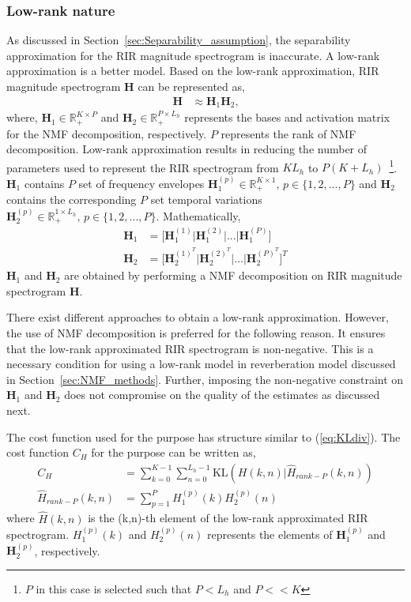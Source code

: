 \subsubsection{Low-rank nature}
As discussed in Section~\ref{sec:Separability_assumption}, the separability approximation for the RIR magnitude spectrogram is inaccurate. A low-rank approximation is a better model. Based on the low-rank approximation, RIR magnitude spectrogram $\mathbf{H}$ can be represented as,
\begin{align}
\mathbf{H} &\approx \mathbf{H}_1\mathbf{H}_2 \text{,}
\end{align}
where, $\mathbf{H}_1 \in \mathbb{R}_+^{K \times P}$ and $\mathbf{H}_2 \in \mathbb{R}_+^{P \times L_h}$ represents the bases and activation matrix for the NMF decomposition, respectively. $P$ represents the rank of NMF decomposition. Low-rank approximation results in reducing the number of parameters used to represent the RIR spectrogram from $KL_h$ to $P(K+L_h)$~\footnote{$P$ in this case is selected such that $P<L_h$ and $P<<K$}.
$\mathbf{H}_1$ contains $P$ set of frequency envelopes $\mathbf{H}_1^{(p)}\in \mathbb{R}_+^{K \times 1} \text{, } p\in \{1,2,...,P \}$ and $\mathbf{H}_2$ contains the corresponding $P$ set temporal variations $\mathbf{H}_2^{(p)}\in \mathbb{R}_+^{1 \times L_h} \text{, } p\in \{1,2,...,P \}$. Mathematically,
\begin{align}
\mathbf{H}_1 &= \bigg[\mathbf{H}_1^{(1)}\bigg|\mathbf{H}_1^{(2)}\bigg|...\bigg|\mathbf{H}_1^{(P)}\bigg] \nonumber \\
\mathbf{H}_2 &= \bigg[\mathbf{H}_2^{(1)^T}\bigg|\mathbf{H}_2^{(2)^T}\bigg|...\bigg|\mathbf{H}_2^{(P)^T} \bigg]^T
\end{align}
$\mathbf{H}_1$ and $\mathbf{H}_2$ are obtained by performing a NMF decomposition on RIR magnitude spectrogram $\mathbf{H}$.

There exist different approaches to obtain a low-rank approximation. However, the use of NMF decomposition is preferred for the following reason. It ensures that the low-rank approximated RIR spectrogram is non-negative. This is a necessary condition for using a low-rank model in reverberation model discussed in Section~\ref{sec:NMF_methods}. Further, imposing the non-negative constraint on $\mathbf{H}_1$ and $\mathbf{H}_2$ does not compromise on the quality of the estimates as discussed next. 

The cost function used for the purpose has structure similar to (\ref{eq:KLdiv}). The cost function $C_H$ for the purpose can be written as,
\begin{align}
C_{H} &= \sum_{k = 0}^{K-1}\sum_{n=0}^{L_h-1}\text{KL} (H(k,n)|\hat{H}_{rank-P}(k,n)) \nonumber \\
\hat{H}_{rank-P}(k,n) &= \sum_{p=1}^P H_1^{(p)}(k) H_2^{(p)}(n)
\end{align}
where $\hat{H}(k,n)$ is the  (k,n)-th element of the low-rank approximated RIR spectrogram. $H_1^{(p)}(k)$ and $H_2^{(p)}(n)$ represents the elements of $\mathbf{H}_1^{(p)}$ and $\mathbf{H}_2^{(p)}$, respectively.


